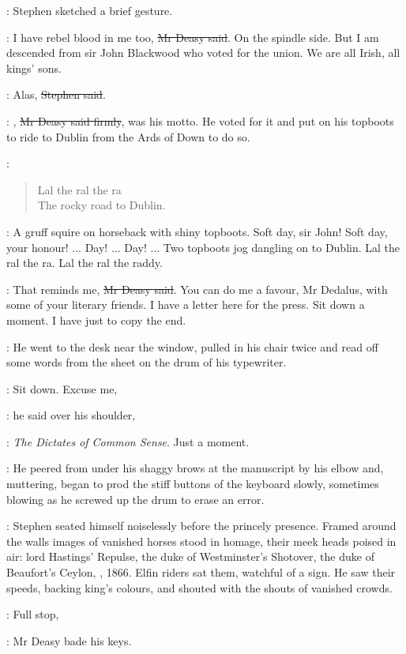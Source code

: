 :
Stephen sketched a brief gesture.

\deasy:
I have rebel blood in me too, \sout{Mr Deasy said}.
On the spindle side.
But I am descended from sir John Blackwood who voted for the union.
We are all Irish,
all kings' sons.

\Stephen:
Alas, \sout{Stephen said}.

\deasy:
, \sout{Mr Deasy said firmly}, was his motto.
He voted for it and put on his topboots to ride to Dublin from the Ards of Down to do so.

\StephenInt:
\begin{verse}
    Lal the ral the ra \\
    The rocky road to Dublin.
\end{verse}

\StephenInt:
A gruff squire on horseback with shiny topboots.
Soft day, sir John!
Soft day, your honour!
... Day!
... Day!
... Two topboots jog dangling on to Dublin.
Lal the ral the ra.
Lal the ral the raddy.

\deasy:
That reminds me, \sout{Mr Deasy said}.
You can do me a favour, Mr Dedalus,
with some of your literary friends.
I have a letter here for the press.
Sit down a moment.
I have just to copy the end.

:
He went to the desk near the window,
pulled in his chair twice
and read off some words from the sheet on the drum of his typewriter.

\deasy:
Sit down.
Excuse me,

:
he said over his shoulder,

\deasy:
\emph{The Dictates of Common Sense}.
Just a moment.

:
He peered from under his shaggy brows at the manuscript by his elbow
and, muttering, began to prod the stiff buttons of the keyboard slowly,
sometimes blowing as he screwed up the drum to erase an error.

:
Stephen seated himself noiselessly before the princely presence.
Framed around the walls
images of vanished horses stood in homage,
their meek heads poised in air:
lord Hastings' Repulse,
the duke of Westminster's Shotover,
the duke of Beaufort's Ceylon,
, 1866.
Elfin riders sat them, watchful of a sign.
He saw their speeds, backing king's colours,
and shouted with the shouts of vanished crowds.

\deasy:
Full stop,

:
Mr Deasy bade his keys.

